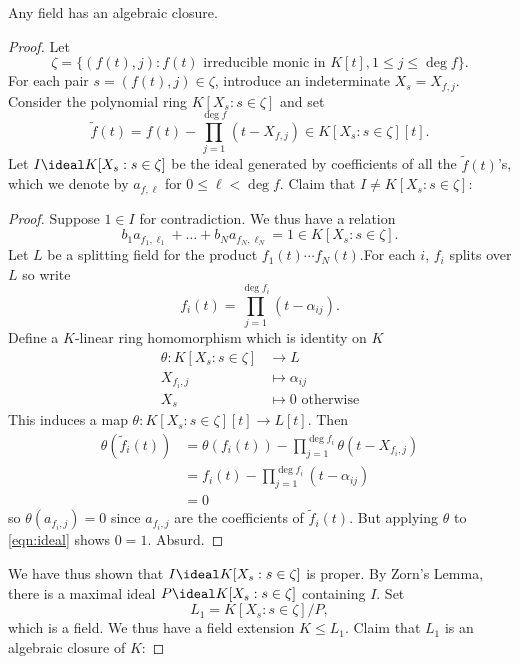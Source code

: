 \documentclass[a4paper]{article}
\begin{document}
\begin{theorem}
  Any field has an algebraic closure.
\end{theorem}

\begin{proof}
  Let
  \[
    \zeta = \{(f(t), j): f(t) \text{ irreducible monic in } K[t], 1 \leq j \leq \deg f \}.
  \]
  For each pair \(s = (f(t), j) \in \zeta\), introduce an indeterminate \(X_s = X_{f, j}\). Consider the polynomial ring \(K[X_s: s \in \zeta]\) and set
  \[
    \tilde f(t) = f(t) - \prod_{j = 1}^{\deg f} (t - X_{f, j}) \in K[X_s: s \in \zeta][t].
  \]
  Let \(I \ideal K[X_s: s \in \zeta]\) be the ideal generated by coefficients of all the \(\tilde f(t)\)'s, which we denote by \(a_{f, \ell}\) for \(0 \leq \ell < \deg f\). Claim that \(I \neq K[X_s: s \in \zeta]\):
  \begin{proof}
    Suppose \(1 \in I\) for contradiction. We thus have a relation
    \begin{equation*}
      \label{eqn:ideal}
      b_1 a_{f_1, \ell_1} + \dots + b_N a_{f_N, \ell_N} = 1 \in K[X_s: s \in \zeta].
      \tag{\(\ast\)}
    \end{equation*}
    Let \(L\) be a splitting field for the product \(f_1(t)\cdots f_N(t)\).For each \(i\), \(f_i\) splits over \(L\) so write
    \[
      f_i(t) = \prod_{j = 1}^{\deg f_i} (t - \alpha_{ij}).
    \]
    Define a \(K\)-linear ring homomorphism which is identity on \(K\)
    \begin{align*}
      \theta: K[X_s: s \in \zeta] &\to L \\
      X_{f_i, j} &\mapsto \alpha_{ij} \\
      X_s &\mapsto 0 \text{ otherwise}
    \end{align*}
    This induces a map \(\theta: K[X_s: s \in \zeta][t] \to L[t]\). Then
    \begin{align*}
      \theta(\tilde f_i(t)) &= \theta(f_i(t)) - \prod_{j = 1}^{\deg f_i} \theta(t - X_{f_i, j}) \\
                            &= f_i(t) - \prod_{j = 1}^{\deg f_i} (t - \alpha_{ij}) \\
                            &= 0
    \end{align*}
    so \(\theta(a_{f_i, j}) = 0\) since \(a_{f_i, j}\) are the coefficients of \(\tilde f_i(t)\). But applying \(\theta\) to \eqref{eqn:ideal} shows \(0 = 1\). Absurd.
  \end{proof}

  We have thus shown that \(I \ideal K[X_s: s \in \zeta]\) is proper. By Zorn's Lemma, there is a maximal ideal \(P \ideal K[X_s: s \in \zeta]\) containing \(I\). Set
  \[
    L_1 = K[X_s: s \in \zeta]/P,
  \]
  which is a field. We thus have a field extension \(K \leq L_1\). Claim that \(L_1\) is an algebraic closure of \(K\):


\end{proof}
\end{document}
